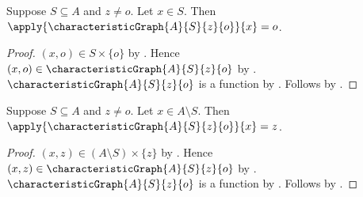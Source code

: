 \begin{proposition}\label{characteristic_graph_one}
    Suppose $S\subseteq A$ and $z\neq o$.
    Let $x\in S$.
    Then $\apply{\characteristicGraph{A}{S}{z}{o}}{x}=o$.
\end{proposition}
\begin{proof}
    $(x,o)\in S\times\{o\}$
        by .
    Hence $(x,o)\in\characteristicGraph{A}{S}{z}{o}$
        by .
    $\characteristicGraph{A}{S}{z}{o}$ is a function
        by .
    Follows by .
\end{proof}

\begin{proposition}\label{characteristic_graph_zero}
    Suppose $S\subseteq A$ and $z\neq o$.
    Let $x\in A\setminus S$.
    Then $\apply{\characteristicGraph{A}{S}{z}{o}}{x}=z$.
\end{proposition}
\begin{proof}
    $(x,z)\in(A\setminus S)\times\{z\}$
        by .
    Hence $(x,z)\in\characteristicGraph{A}{S}{z}{o}$
        by .
    $\characteristicGraph{A}{S}{z}{o}$ is a function
        by .
    Follows by .
\end{proof}

